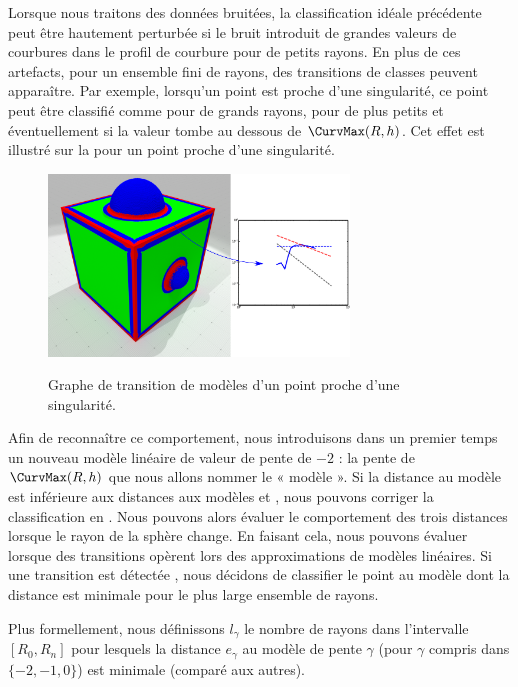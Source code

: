 Lorsque nous traitons des données bruitées, la classification idéale
précédente peut être hautement perturbée si le bruit introduit de grandes
valeurs de courbures dans le profil de courbure pour de petits rayons. En plus
de ces artefacts, pour un ensemble fini de rayons, des transitions de classes
peuvent apparaître. Par exemple, lorsqu'un point est proche d'une singularité, ce
point peut être classifié comme \featedge pour de grands rayons, \featsmooth
pour de plus petits et éventuellement \featflat si la valeur tombe au dessous de
$\CurvMax(R,h)$. Cet effet est illustré sur la  pour un
point proche d'une singularité.

\begin{figure}
\begin{center}
  {\includegraphics[width=8cm]{figures/CubeSpherePlot_transition}}
  \caption{Graphe de transition de modèles d'un point proche d'une singularité.}
  \label{fig:inversion}
\end{center}
\end{figure}

Afin de reconnaître ce comportement, nous introduisons dans un premier temps
un nouveau modèle linéaire de valeur de pente de $-2$ : la pente de
$\CurvMax(R,h)$ que nous allons nommer le « modèle \featflat ». Si la distance
au modèle \featflat est inférieure aux distances aux modèles \featsmooth et
\featedge, nous pouvons corriger la classification en \featflat. Nous pouvons
alors évaluer le comportement des trois distances lorsque le rayon de la sphère
change. En faisant cela, nous pouvons évaluer lorsque des transitions opèrent
lors des approximations de modèles linéaires. Si une transition est détectée
, nous décidons de classifier le point au
modèle dont la distance est minimale pour le plus large ensemble de rayons.

Plus formellement, nous définissons $l_{\gamma}$ le nombre de rayons dans
l'intervalle $[R_0,R_n]$ pour lesquels la distance $e_\gamma$ au modèle de pente
$\gamma$ (pour $\gamma$ compris dans $\{-2, -1, 0\}$) est minimale (comparé aux
autres).

